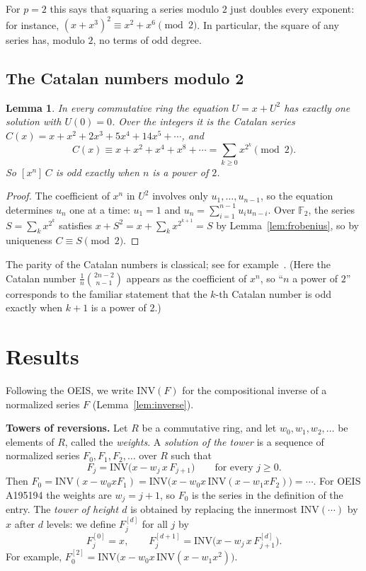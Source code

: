 \documentclass[11pt,a4paper]{article}
\newtheorem{lemma}[theorem]{Lemma}
\theoremstyle{definition}
\theoremstyle{remark}
\newcommand{\F}{\mathbb{F}}
\newcommand{\coeff}[2]{[x^{#1}]\,#2}
\newcommand{\para}[1]{\par\medskip\noindent\textbf{#1}\enspace}
\begin{document}
For $p=2$ this says that squaring a series modulo $2$ just doubles every exponent: for instance,
$(x+x^3)^2\equiv x^2+x^6\pmod2$. In particular, the square of any series has, modulo $2$, no terms of odd degree.

\subsection{The Catalan numbers modulo 2}
\begin{lemma}\label{lem:catalan}
In every commutative ring the equation $U=x+U^2$ has exactly one solution with $U(0)=0$. Over the integers it is the
Catalan series $C(x)=x+x^2+2x^3+5x^4+14x^5+\cdots$, and
\[
C(x)\equiv x+x^2+x^4+x^8+\cdots=\sum_{k\ge0}x^{2^k}\pmod 2 .
\]
So $\coeff{n}{C}$ is odd exactly when $n$ is a power of $2$.
\end{lemma}

\begin{proof}
The coefficient of $x^n$ in $U^2$ involves only $u_1,\dots,u_{n-1}$, so the equation determines $u_n$ one at a time:
$u_1=1$ and $u_n=\sum_{i=1}^{n-1}u_iu_{n-i}$. Over $\F_2$, the series $S=\sum_kx^{2^k}$ satisfies
$x+S^2=x+\sum_kx^{2^{k+1}}=S$ by Lemma~\ref{lem:frobenius}, so by uniqueness $C\equiv S\pmod2$.
\end{proof}
The parity of the Catalan numbers is classical; see for example~\cite{deutschsagan}. (Here the Catalan number
$\frac1{n}\binom{2n-2}{n-1}$ appears as the coefficient of $x^n$, so ``$n$ a power of $2$'' corresponds to the familiar
statement that the $k$-th Catalan number is odd exactly when $k+1$ is a power of $2$.)


\section{Results}\label{sec:results}

Following the OEIS, we write $\mathrm{INV}(F)$ for the compositional inverse of a normalized series $F$
(Lemma~\ref{lem:inverse}).

\para{Towers of reversions.} Let $R$ be a commutative ring, and let $w_0,w_1,w_2,\dots$ be elements of $R$, called the
\emph{weights}. A \emph{solution of the tower} is a sequence of normalized series $F_0,F_1,F_2,\dots$ over $R$ such that
\begin{equation}\label{eq:tails}
F_j=\mathrm{INV}\bigl(x-w_j\,x\,F_{j+1}\bigr)\qquad\text{for every }j\ge0 .
\end{equation}
Then $F_0=\mathrm{INV}(x-w_0xF_1)=\mathrm{INV}\bigl(x-w_0x\,\mathrm{INV}(x-w_1xF_2)\bigr)=\cdots$. For OEIS A195194 the
weights are $w_j=j+1$, so $F_0$ is the series in the definition of the entry. The \emph{tower of height $d$} is obtained
by replacing the innermost $\mathrm{INV}(\cdots)$ by $x$ after $d$ levels: we define $F^{[d]}_j$ for all $j$ by
\[
F^{[0]}_j=x,\qquad F^{[d+1]}_j=\mathrm{INV}\bigl(x-w_j\,x\,F^{[d]}_{j+1}\bigr).
\]
For example, $F^{[2]}_0=\mathrm{INV}\bigl(x-w_0x\,\mathrm{INV}(x-w_1x^2)\bigr)$.
\end{document}
